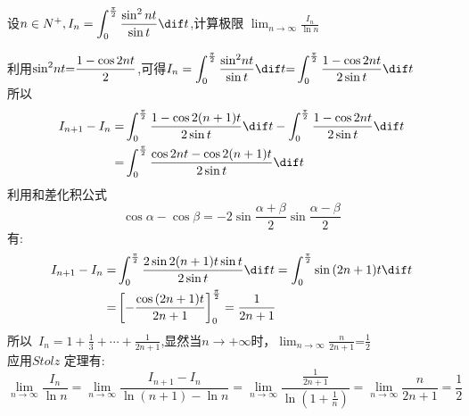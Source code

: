 \documentclass[color=green,titlestyle=hang]{elegantbook}%
\begin{document}
\begin{exercise}
设$n\in N^{+},I_{n}=\displaystyle\int_0^{\frac {\pi}{2}} \frac{\sin^2nt}{\sin t}\dif t$,计算极限
$\displaystyle\lim_{n \to \infty}\frac{I_{n}}{\ln n}$\\\end{exercise}
\begin{solution}利用$\displaystyle{\sin ^2}nt{\rm{ = }}\frac{{{\rm{1}} - \cos 2nt}}{2}$,\mbox{可得}$\displaystyle{I_n} = \int_0^{\frac{\pi }{2}} {\frac{{{{\sin }^2}nt}}{{\sin t}}} \dif t{\rm{ = }}\int_0^{\frac{\pi }{2}} {\frac{{{\rm{1}} - \cos 2nt}}{{2\sin t}}} \dif t$\\所以\begin{equation*}\begin{aligned}I_{n+1}-I_{n}
=&\int_0^{\frac{\pi}{2}}\frac{1-\cos{2(n+1)t}}{2\sin t}\dif t-\int_0^{\frac{\pi}{2}}\frac{1-\cos{2nt}}{2\sin t}\dif t\\
=&\int_0^{\frac{\pi}{2}}\frac{\cos 2nt-\cos2(n+1)t}{2\sin t}\dif t
\end{aligned}\end{equation*}
利用和差化积公式
\begin{equation*}\cos \alpha  - \cos \beta =- 2\sin \frac{{\alpha  + \beta }}{2}\sin \frac{{\alpha  - \beta }}{2}\end{equation*}
有:\begin{equation*}\begin{aligned}
I_{n+1}-I_{n}=&\int_0^{\frac{\pi}{2}}\frac{2\sin{2(n+1)t}\sin t}{2\sin t}\dif t=\int_0^{\frac{\pi}{2}}\sin{(2n+1)t}\dif t\\
=&\left[-\frac{\cos {(2n+1)t}}{2n+1}\right]_0^{\frac{\pi}{2}}=\frac{1}{2n+1}
\end{aligned}\end{equation*}
所以~$\displaystyle I_{n}=1+\frac{1}{3}+\cdots+\frac{1}{2n+1}$,显然当$n\rightarrow+\infty$时，$\displaystyle\lim_{n \to\infty}\frac{n}{2n+1}$=$\displaystyle\frac{1}{2}$\\[2mm]
应用$Stolz$ 定理有:
\[\lim_{n\to\infty}\frac{I_{n}}{\ln n}=\lim_{n\to\infty}\frac{I_{n+1}-I_{n}}{\ln(n+1)-\ln n}=\lim_{n\to\infty}\frac{\frac{1}{2n+1}}{\ln(1+\frac{1}{n})}=\lim_{n\to\infty}\frac{n}{2n+1}
=\frac{1}{2}\]
\end{solution}
\end{document}
